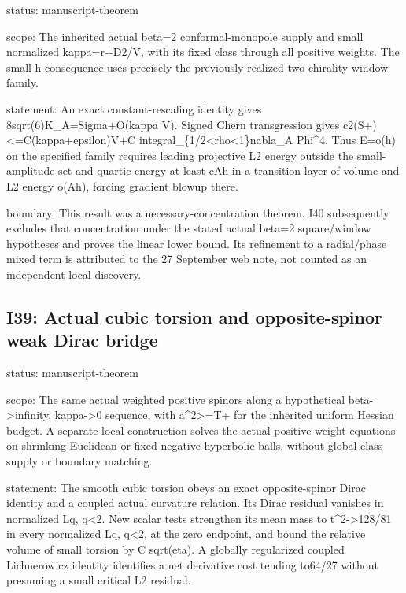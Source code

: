 \documentclass[
  10pt,
]{article}
\begin{document}
status: manuscript-theorem

scope: The inherited actual beta=2 conformal-monopole supply and small
normalized kappa=r+D2/V, with its fixed class through all positive
weights. The small-h consequence uses precisely the previously realized
two-chirality-window family.

statement: An exact constant-rescaling identity gives
8sqrt(6)K\_A=Sigma+O(kappa V). Signed Chern transgression gives
c2(S+)\textless=C(kappa+epsilon)V+C
integral\_\{1/2\textless rho\textless1\}\textbar nabla\_A
Phi\textbar\^{}4. Thus E=o(h) on the specified family requires leading
projective L2 energy outside the small-amplitude set and quartic energy
at least cAh in a transition layer of volume and L2 energy o(Ah),
forcing gradient blowup there.

boundary: This result was a necessary-concentration theorem. I40
subsequently excludes that concentration under the stated actual beta=2
square/window hypotheses and proves the linear lower bound. Its
refinement to a radial/phase mixed term is attributed to the 27
September web note, not counted as an independent local discovery.

\hypertarget{i39-actual-cubic-torsion-and-opposite-spinor-weak-dirac-bridge}{%
\subsection{I39: Actual cubic torsion and opposite-spinor weak Dirac
bridge}\label{i39-actual-cubic-torsion-and-opposite-spinor-weak-dirac-bridge}}

status: manuscript-theorem

scope: The same actual weighted positive spinors along a hypothetical
beta-\textgreater infinity, kappa-\textgreater0 sequence, with
a\^{}2\textgreater=T+ for the inherited uniform Hessian budget. A
separate local construction solves the actual positive-weight equations
on shrinking Euclidean or fixed negative-hyperbolic balls, without
global class supply or boundary matching.

statement: The smooth cubic torsion obeys an exact opposite-spinor Dirac
identity and a coupled actual curvature relation. Its Dirac residual
vanishes in normalized Lq, q\textless2. New scalar tests strengthen its
mean mass to \textbar t\textbar\^{}2-\textgreater128/81 in every
normalized Lq, q\textless2, at the zero endpoint, and bound the relative
volume of small torsion by C sqrt(eta). A globally regularized coupled
Lichnerowicz identity identifies a net derivative cost tending to64/27
without presuming a small critical L2 residual.
\end{document}
